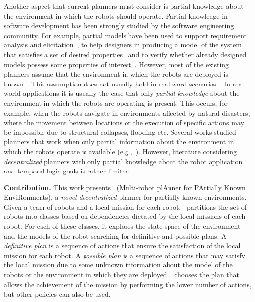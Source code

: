 Another aspect that current planners must consider is partial knowledge  about the environment in which the robots should operate.
Partial knowledge in software development has been strongly studied by the  software engineering community.
For example, partial models have been used to support requirement analysis and elicitation~\cite{menghi2017integrating,menghi2017cover,letier2008deriving}, to help designers in producing a model of the system that satisfies a set of desired properties~\cite{uchitel2009synthesis,uchitel2013supporting,famelis2012partial,albarghouthi2012under} and to verify whether  already designed models possess some properties of interest~\cite{menghi2016dealing,bruns1999model,chechik2004multi}.
However, most of the existing planners assume that the environment in which the robots are deployed is known~\cite{7139412}. 
This assumption does not usually hold in real word scenarios~\cite{lahijanian2016iterative}.
In real world applications it is usually the case that only \emph{partial knowledge} about the environment in which the robots are operating is present.
This occurs, for example, when the robots navigate in environments affected by natural disasters, where the movement between locations or the execution of specific actions may be impossible due to structural collapses, flooding etc.
Several works studied planners that work when only partial information about the environment in which the robots operate is available (e.g.,~\cite{roy2006planning,du2012robot,diaz2001exploring}).
However, %
literature considering \emph{decentralized} planners %
with only partial knowledge about the robot application and temporal logic goals
is rather limited \cite{guo2015multi}.

\textbf{Contribution.}
This work presents  \toolName\ (Multi-robot plAnner for PArtially Known EnviRonments), a \emph{novel} \emph{decentralized} planner for partially known environments.
Given a team of robots and a local mission for each robot, \toolName\ partitions the set of robots into classes based on dependencies dictated by the local missions of each robot.
For each of these classes, it explores the state space of the environment and the models of the robot searching for definitive and possible plans.
A \emph{definitive plan} is a sequence of actions that ensure the satisfaction of the local mission for each robot.
A \emph{possible plan} is a sequence of actions that may satisfy the local mission due to some unknown information about the model of the robots or the environment in which they are deployed.
\toolName\ chooses the plan that allows the achievement of the mission by performing the lower number of actions, but other policies can also be used.


